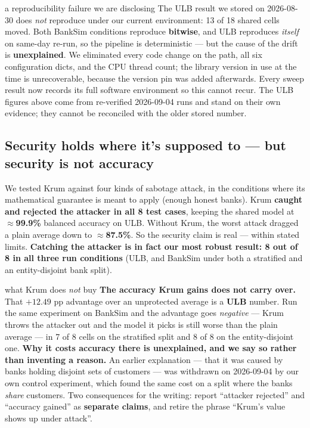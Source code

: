 \documentclass[11pt]{article}
\begin{document}
\begin{caveat}{a reproducibility failure we are disclosing}
The ULB result we stored on 2026-08-30 does \emph{not} reproduce under our current environment: 13 of 18
shared cells moved. Both BankSim conditions reproduce \textbf{bitwise}, and ULB reproduces \emph{itself}
on same-day re-run, so the pipeline is deterministic --- but the cause of the drift is
\textbf{unexplained}. We eliminated every code change on the path, all six configuration dicts, and the
CPU thread count; the library version in use at the time is unrecoverable, because the version pin was
added afterwards. Every sweep result now records its full software environment so this cannot recur. The
ULB figures above come from re-verified 2026-09-04 runs and stand on their own evidence; they cannot be
reconciled with the older stored number.
\end{caveat}

\subsection{Security holds where it's supposed to --- but security is not accuracy}
We tested Krum against four kinds of sabotage attack, in the conditions where its mathematical guarantee
is meant to apply (enough honest banks). Krum \textbf{caught and rejected the attacker in all 8 test
cases}, keeping the shared model at \textbf{$\approx$99.9\%} balanced accuracy on ULB. Without Krum, the
worst attack dragged a plain average down to \textbf{$\approx$87.5\%}. So the security claim is real ---
within stated limits. \textbf{Catching the attacker is in fact our most robust result: 8 out of 8 in all
three run conditions} (ULB, and BankSim under both a stratified and an entity-disjoint bank split).

\begin{caveat}{what Krum does \emph{not} buy}
\textbf{The accuracy Krum gains does not carry over.} That $+12.49$ pp advantage over an unprotected
average is a \textbf{ULB} number. Run the same experiment on BankSim and the advantage goes
\emph{negative} --- Krum throws the attacker out and the model it picks is still worse than the plain
average --- in 7 of 8 cells on the stratified split and 8 of 8 on the entity-disjoint one.
\textbf{Why it costs accuracy there is unexplained, and we say so rather than inventing a reason.} An
earlier explanation --- that it was caused by banks holding disjoint sets of customers --- was withdrawn
on 2026-09-04 by our own control experiment, which found the same cost on a split where the banks
\emph{share} customers. Two consequences for the writing: report ``attacker rejected'' and ``accuracy
gained'' as \textbf{separate claims}, and retire the phrase ``Krum's value shows up under attack''.
\end{caveat}
\end{document}
